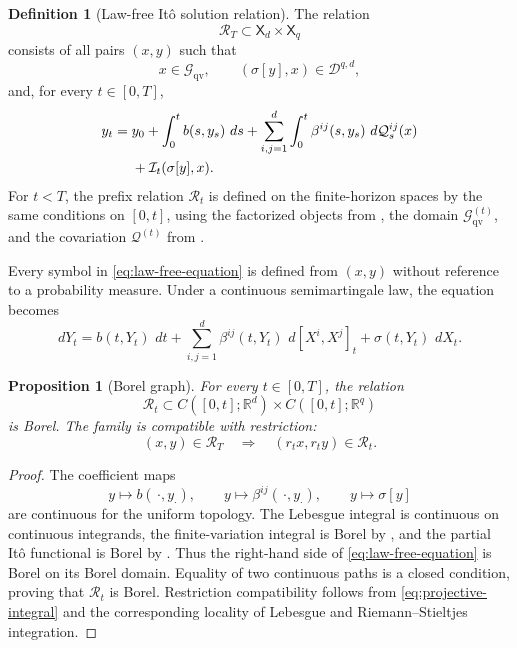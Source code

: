 \documentclass[11pt,reqno]{amsart}
\theoremstyle{plain}
\newtheorem{proposition}[proposition]{Proposition}
\theoremstyle{definition}
\newtheorem{definition}[definition]{Definition}
\newcommand{\R}{\mathbb R}
\newcommand{\cD}{\mathcal D}
\newcommand{\cG}{\mathcal G}
\newcommand{\cI}{\mathcal I}
\newcommand{\cR}{\mathcal R}
\newcommand{\dd}{\,d}
\newcommand{\qv}{\mathcal Q}
\begin{document}
\begin{definition}[Law-free It\^o solution relation]
\label{def:solution-relation}
The relation
\[
  \cR_T\subset\mathsf X_d\times\mathsf X_q
\]
consists of all pairs \((x,y)\) such that
\[
  x\in\cG_{\mathrm{qv}},
  \qquad
  (\sigma[y],x)\in\cD^{q,d},
\]
and, for every \(t\in[0,T]\),
\begin{align}
  y_t
  ={}&y_0
  +\int_0^t b(s,y_s)\,\dd s
  +\sum_{i,j=1}^d
      \int_0^t\beta^{ij}(s,y_s)\,\dd\qv_s^{ij}(x)
  \notag\\
  &+\cI_t(\sigma[y],x).
  \label{eq:law-free-equation}
\end{align}
For \(t<T\), the prefix relation \(\cR_t\) is defined on the finite-horizon
spaces by the same conditions on \([0,t]\), using the factorized objects from
, the domain
\(\cG_{\mathrm{qv}}^{(t)}\), and the covariation
\(\qv^{(t)}\) from .
\end{definition}

Every symbol in \eqref{eq:law-free-equation} is defined from \((x,y)\)
without reference to a probability measure.  Under a continuous
semimartingale law, the equation becomes
\begin{equation}\label{eq:classical-equation}
  dY_t
  =
  b(t,Y_t)\,\dd t
  +\sum_{i,j=1}^d\beta^{ij}(t,Y_t)\,\dd[X^i,X^j]_t
  +\sigma(t,Y_t)\,\dd X_t.
\end{equation}

\begin{proposition}[Borel graph]\label{prop:borel-graph}
For every \(t\in[0,T]\), the relation
\[
  \cR_t\subset
  C([0,t];\R^d)\times C([0,t];\R^q)
\]
is Borel.  The family is compatible with restriction:
\begin{equation}\label{eq:relation-restriction}
  (x,y)\in\cR_T
  \quad\Longrightarrow\quad
  (r_tx,r_ty)\in\cR_t .
\end{equation}
\end{proposition}

\begin{proof}
The coefficient maps
\[
  y\mapsto b(\,\cdot,y_\cdot),\qquad
  y\mapsto\beta^{ij}(\,\cdot,y_\cdot),\qquad
  y\mapsto\sigma[y]
\]
are continuous for the uniform topology.  The Lebesgue integral is
continuous on continuous integrands, the finite-variation integral is Borel
by , and the partial It\^o functional is Borel by
.  Thus the right-hand side of
\eqref{eq:law-free-equation} is Borel on its Borel domain.  Equality of two
continuous paths is a closed condition, proving that \(\cR_t\) is Borel.
Restriction compatibility follows from
\eqref{eq:projective-integral} and the corresponding locality of Lebesgue and
Riemann--Stieltjes integration.
\end{proof}
\end{document}
